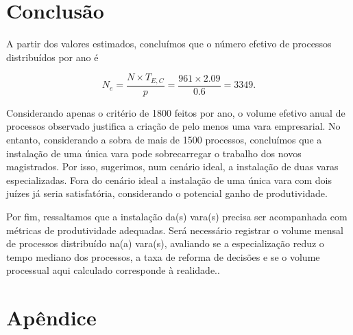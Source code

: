 \documentclass[]{book}
\begin{document}
\chapter{Conclusão}\label{conclusao}

A partir dos valores estimados, concluímos que o número efetivo de
processos distribuídos por ano é

\[
N_e = \frac{N \times T_{E,C}}{p} = \frac{961 \times 2.09}{0.6} = 3349.
\]

Considerando apenas o critério de 1800 feitos por ano, o volume efetivo
anual de processos observado justifica a criação de pelo menos uma vara
empresarial. No entanto, considerando a sobra de mais de 1500 processos,
concluímos que a instalação de uma única vara pode sobrecarregar o
trabalho dos novos magistrados. Por isso, sugerimos, num cenário ideal,
a instalação de duas varas especializadas. Fora do cenário ideal a
instalação de uma única vara com dois juízes já seria satisfatória,
considerando o potencial ganho de produtividade.

Por fim, ressaltamos que a instalação da(s) vara(s) precisa ser
acompanhada com métricas de produtividade adequadas. Será necessário
registrar o volume mensal de processos distribuído na(a) vara(s),
avaliando se a especialização reduz o tempo mediano dos processos, a
taxa de reforma de decisões e se o volume processual aqui calculado
corresponde à realidade..

\chapter{Apêndice}\label{apendice}
\end{document}
